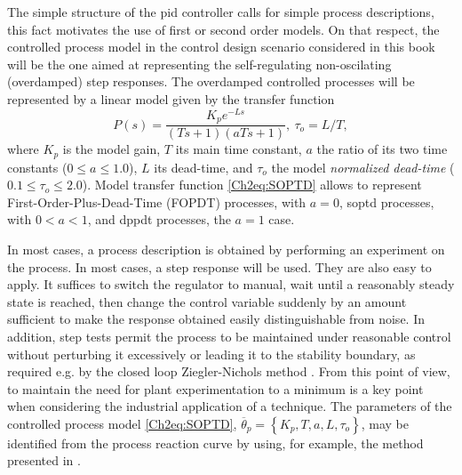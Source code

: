 The simple structure of the \gls{pid} controller calls for simple process descriptions, this fact motivates the use of first or second order models. On that respect, the controlled process model in the control design scenario considered in this book will be the one aimed at representing the self-regulating non-oscilating (overdamped) step responses. The overdamped controlled processes will be represented by a linear model given by the transfer function
%
\begin{equation}
    P(s) = \frac{K_p e^{-Ls}}{(Ts+1)(aTs+1)}, \ \tau_o = L/T, 
    \label{Ch2eq:SOPTD}
\end{equation}
%
where $K_p$ is the model gain, $T$ its main time constant, $a$ the ratio of its two time constants ($0 \leq a \leq 1.0$), $L$ its dead-time, and $\tau_o$ the model \emph{normalized dead-time} ($0.1 \leq \tau_o \leq 2.0$). Model transfer function \eqref{Ch2eq:SOPTD} allows to represent First-Order-Plus-Dead-Time (FOPDT) processes, with $a=0$, \gls{soptd} processes, with $0 < a < 1$, and \gls{dppdt} processes, the $a=1$ case.

In most cases, a process description is obtained by performing an experiment on the process. In most cases, a step response will be used. They are also easy to apply. It suffices to switch the regulator to manual, wait until a reasonably steady state is reached, then change the control variable suddenly by an amount sufficient to make the response obtained easily distinguishable from noise. In addition, step tests permit the process to be maintained under reasonable control without perturbing it excessively or leading it to the stability boundary, as required e.g. by the closed loop Ziegler-Nichols method \citep{astromhagglund2006}. From this point of view, to maintain the need for plant experimentation to a minimum is a key point when considering the industrial application of a technique. The parameters of the controlled process model \eqref{Ch2eq:SOPTD}, $\overline{\theta}_p = \left\{K_p, T, a, L, \tau_o \right\}$, may be identified from the process reaction curve by using, for example, the method presented in \citep{alfaro2006-1}. 



